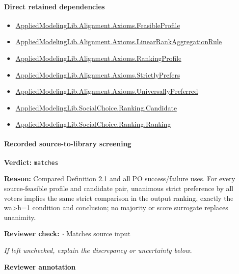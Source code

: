 \documentclass[10pt]{article}
\newcommand{\reviewerbox}{%
  \par\noindent\fbox{\parbox{0.96\linewidth}{\rule{0pt}{0.38in}}}\par
}
\newcommand{\reviewmatch}[1]{%
  \par\noindent\textbf{Reviewer check:} $\square$\; #1\par
  \noindent\emph{If left unchecked, explain the discrepancy or uncertainty below.}\par
}
\begin{document}
\paragraph{Direct retained dependencies}
\begin{itemize}\raggedright
\item \hyperlink{library-prerequisite-5fa7bdb49b050adf}{Applied\allowbreak{}Modeling\allowbreak{}Lib.\allowbreak{}Alignment.\allowbreak{}Axioms.\allowbreak{}Feasible\allowbreak{}Profile}
\item \hyperlink{library-prerequisite-43447e121a1884f9}{Applied\allowbreak{}Modeling\allowbreak{}Lib.\allowbreak{}Alignment.\allowbreak{}Axioms.\allowbreak{}Linear\allowbreak{}Rank\allowbreak{}Aggregation\allowbreak{}Rule}
\item \hyperlink{library-prerequisite-9bded048a60dfe0a}{Applied\allowbreak{}Modeling\allowbreak{}Lib.\allowbreak{}Alignment.\allowbreak{}Axioms.\allowbreak{}Ranking\allowbreak{}Profile}
\item \hyperlink{library-prerequisite-191720c2353b55e9}{Applied\allowbreak{}Modeling\allowbreak{}Lib.\allowbreak{}Alignment.\allowbreak{}Axioms.\allowbreak{}Strictly\allowbreak{}Prefers}
\item \hyperlink{governing-declaration-99d993d3d0fe5e5d}{Applied\allowbreak{}Modeling\allowbreak{}Lib.\allowbreak{}Alignment.\allowbreak{}Axioms.\allowbreak{}Universally\allowbreak{}Preferred}
\item \hyperlink{library-prerequisite-8c0e6c25845ae78a}{Applied\allowbreak{}Modeling\allowbreak{}Lib.\allowbreak{}Social\allowbreak{}Choice.\allowbreak{}Ranking.\allowbreak{}Candidate}
\item \hyperlink{library-prerequisite-5cde54446d1ae021}{Applied\allowbreak{}Modeling\allowbreak{}Lib.\allowbreak{}Social\allowbreak{}Choice.\allowbreak{}Ranking.\allowbreak{}Ranking}
\end{itemize}
\paragraph{Recorded source-to-library screening}
\textbf{Verdict:} \texttt{matches}
\\
{\raggedright
\textbf{Reason:} Compared Definition 2.\allowbreak{}1 and all PO success/\allowbreak{}failure uses.\allowbreak{} For every source-\allowbreak{}feasible profile and candidate pair, unanimous strict preference by all voters implies the same strict comparison in the output ranking, exactly the wa>b=1 condition and conclusion;\allowbreak{} no majority or score surrogate replaces unanimity.\allowbreak{}
\par}
\reviewmatch{Matches source input}
\noindent\textbf{Reviewer annotation}\par
\reviewerbox
\clearpage
\hypertarget{library-prerequisite-ad3d3904c31ec7b5}{}
\end{document}

